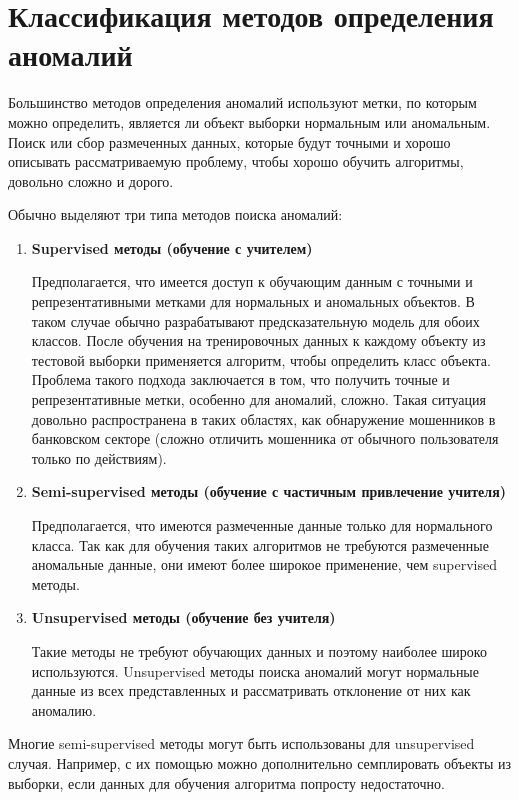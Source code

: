 \section{Классификация методов определения аномалий} \label{sec:ch1/sec3}

Большинство методов определения аномалий используют метки, по которым можно определить, является ли объект выборки нормальным или аномальным. Поиск или сбор размеченных данных, которые будут точными и хорошо описывать рассматриваемую проблему, чтобы хорошо обучить алгоритмы, довольно сложно и дорого.

\noindent Обычно выделяют три типа методов поиска аномалий:

\begin{enumerate}
	\item \textbf{Supervised методы (обучение с учителем)}

Предполагается, что имеется доступ к обучающим данным с точными и репрезентативными метками для нормальных и аномальных объектов. В таком случае обычно разрабатывают предсказательную модель для обоих классов. После обучения на тренировочных данных к каждому объекту из тестовой выборки применяется алгоритм, чтобы определить класс объекта. Проблема такого подхода заключается в том, что получить точные и репрезентативные метки, особенно для аномалий, сложно. Такая ситуация довольно распространена в таких областях, как обнаружение мошенников в банковском секторе (сложно отличить мошенника от обычного пользователя только по действиям).
	
	\item \textbf{Semi-supervised методы (обучение с частичным привлечение учителя)}

Предполагается, что имеются размеченные данные только для нормального класса. Так как для обучения таких алгоритмов не требуются размеченные аномальные данные, они имеют более широкое применение, чем supervised методы.
	\item \textbf{Unsupervised методы (обучение без учителя)}

Такие методы не требуют обучающих данных и поэтому наиболее широко используются. Unsupervised методы поиска аномалий могут нормальные данные из всех представленных и рассматривать отклонение от них как аномалию.
\end{enumerate}
Многие semi-supervised методы могут быть использованы для unsupervised случая. Например, с их помощью можно дополнительно семплировать объекты из выборки, если данных для обучения алгоритма попросту недостаточно.

